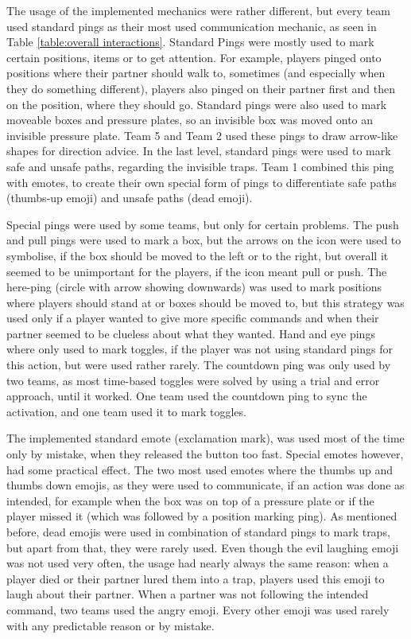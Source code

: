 The usage of the implemented mechanics were rather different, but every team used standard pings as their most used communication mechanic, as seen in Table \ref{table:overall interactions}. 
Standard Pings were mostly used to mark certain positions, items or to get attention. For example, players pinged onto positions where their partner should walk to, sometimes (and especially when they do something different), players also pinged on their partner first and then on the position, where they should go.
Standard pings were also used to mark moveable boxes and pressure plates, so an invisible box was moved onto an invisible pressure plate. Team 5 and Team 2 used these pings to draw arrow-like shapes for direction advice. 
In the last level, standard pings were used to mark safe and unsafe paths, regarding the invisible traps. Team 1 combined this ping with emotes, to create their own special form of pings to differentiate safe paths (thumbs-up emoji) and unsafe paths (dead emoji).

Special pings were used by some teams, but only for certain problems. The push and pull pings were used to mark a box, but the arrows on the icon were used to symbolise, if the box should be moved to the left or to the right, but overall it seemed to be unimportant for the players, if the icon meant pull or push.
The here-ping (circle with arrow showing downwards) was used to mark positions where players should stand at or boxes should be moved to, but this strategy was used only if a player wanted to give more specific commands and when their partner seemed to be clueless about what they wanted.
Hand and eye pings where only used to mark toggles, if the player was not using standard pings for this action, but were used rather rarely.
The countdown ping was only used by two teams, as most time-based toggles were solved by using a trial and error approach, until it worked. One team used the countdown ping to sync the activation, and one team used it to mark toggles.

The implemented standard emote (exclamation mark), was used most of the time only by mistake, when they released the button too fast.
Special emotes however, had some practical effect. The two most used emotes where the thumbs up and thumbs down emojis, as they were used to communicate, if an action was done as intended, for example when the box was on top of a pressure plate or if the player missed it (which was followed by a position marking ping).
As mentioned before, dead emojis were used in combination of standard pings to mark traps, but apart from that, they were rarely used. Even though the evil laughing emoji was not used very often, the usage had nearly always the same reason: when a player died or their partner lured them into a trap, players used this emoji to laugh about their partner. When a partner was not following the intended command, two teams used the angry emoji. Every other emoji was used rarely with any predictable reason or by mistake.

